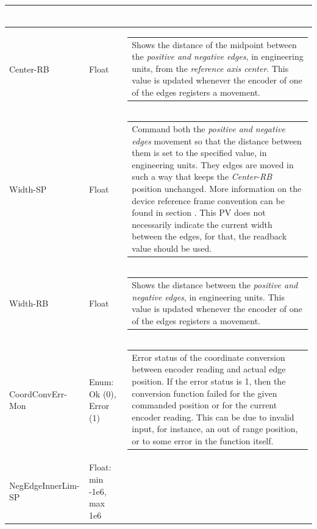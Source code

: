 \documentclass[openany]{article}
\begin{document}
\begin{longtable}{| m{4.5cm} m{2.5cm}  m{7.0cm} |}
\begin{tabular}{@{}m{6cm}@{}}
            \end{tabular} \hypertarget{}{}\\ \hline
        Center-RB & Float & \begin{tabular}{@{}m{6cm}@{}}
                Shows the distance of the midpoint between the \emph{positive and negative edges}, in engineering units, from the \emph{reference axis center}. This value is updated whenever the encoder of one of the edges registers a movement.
            \end{tabular} \hypertarget{pv:width}{}\\ \hline
        Width-SP & Float & \begin{tabular}{@{}m{6cm}@{}}
                Command both the \emph{positive and negative edges} movement so that the distance between them is set to the specified value, in engineering units. They edges are moved in such a way that keeps the \emph{Center-RB} position unchanged. More information on the device reference frame convention can be found in section \nameref{sec:dev-reference-frame}. This PV does not necessarily indicate the current width between the edges, for that, the readback value should be used.
            \end{tabular} \hypertarget{}{}\\ \hline
        Width-RB & Float & \begin{tabular}{@{}m{6cm}@{}}
                Shows the distance between the \emph{positive and negative edges}, in engineering units. This value is updated whenever the encoder of one of the edges registers a movement.
            \end{tabular} \hypertarget{pv:coord-conv-err-mon}{}\\ \hline
        CoordConvErr-Mon & Enum: Ok (0), Error (1) & \begin{tabular}{@{}m{6cm}@{}}
                Error status of the coordinate conversion between encoder reading and actual edge position. If the error status is 1, then the conversion function failed for the given commanded position or for the current encoder reading. This can be due to invalid input, for instance, an out of range position, or to some error in the function itself.
            \end{tabular} \hypertarget{pv:neg-edge-inner-lim}{}\\ \hline
        NegEdgeInnerLim-SP & Float: min -1e6, max 1e6 & \begin{tabular}{@{}m{6cm}@{}}

\end{tabular}
\end{longtable}
\end{document}
